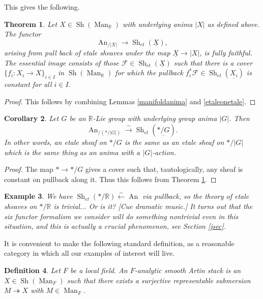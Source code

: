 \documentclass[12pt]{article}
\newtheorem{theorem}{Theorem}[section]
\newtheorem{corollary}[theorem]{Corollary}
\newtheorem{definition}[theorem]{Definition}
\newtheorem{example}[theorem]{Example}
\newcommand{\on}{\operatorname}
\newcommand{\mbb}{\mathbb}
\begin{document}
This gives the following.

\begin{theorem}\label{locconst}
Let $X\in\on{Sh}(\on{Man}_{\mbb{R}})$ with underlying anima $|X|$ as defined above.  The functor
$$\on{An}_{/|X|}\rightarrow \on{Sh}_{et}(\underline{X}),$$
arising from pull back of etale sheaves under the map $\underline{X}\rightarrow |X|$, is fully faithful.  The essential image consists of those $\mathcal{F}\in\on{Sh}_{et}(\underline{X})$ such that there is a cover $\{f_i:X_i\rightarrow X\}_{i\in I}$ in $\on{Sh}(\on{Man}_{\mbb{R}})$ for which the pullback $f_i^\ast\mathcal{F}\in \on{Sh}_{et}(\underline{X_i})$ is constant for all $i\in I$.
\end{theorem}
\begin{proof}
This follows by combining Lemmas \ref{manifoldanima} and \ref{etaleonetale}.
\end{proof}

\begin{corollary}
Let $G$ be an $\mathbb{R}$-Lie group with underlying group anima $|G|$.  Then
$$\on{An}_{/(\ast/|G|)}\overset{\sim}{\rightarrow} \on{Sh}_{et}(\underline{\ast/G}).$$
In other words, an etale sheaf on $\ast/G$ is the same as an etale sheaf on $\ast/|G|$ which is the same thing as an anima with a $|G|$-action.
\end{corollary}
\begin{proof}
The map $\ast \rightarrow \ast/G$ gives a cover such that, tautologically, any sheaf is constant on pullback along it.  Thus this follows from Theorem \ref{locconst}.
\end{proof}

\begin{example}
We have $\on{Sh}_{et}(\ast/\mathbb{R})\overset{\sim}{\leftarrow}\on{An}$ via pullback, so the theory of etale sheaves on $\ast/\mathbb{R}$ is trivial... Or is it? [Cue dramatic music.] It turns out that the six functor formalism we consider will do something nontrivial even in this situation, and this is actually a crucial phenomenon, see Section \ref{jsec}.
\end{example}


It is convenient to make the following standard definition, as a reasonable category in which all our examples of interest will live.

\begin{definition}
Let $F$ be a local field.  An \emph{$F$-analytic smooth Artin stack} is an $X\in\on{Sh}(\on{Man}_F)$ such that there exists a surjective representable submersion $M\twoheadrightarrow X$ with $M\in\on{Man}_F$.
\end{definition}
\end{document}
